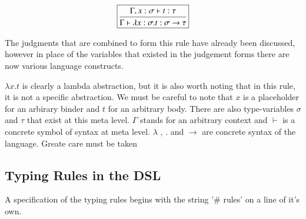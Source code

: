 $$\boxed{
\mbox{\begin {prooftree}
  \hypo{\Gamma , x : \sigma \vdash t : \tau}
  \infer1[]{\Gamma \vdash \lambda x : \sigma . t : \sigma \to \tau}
\end {prooftree}}
}$$


The judgments that are combined to form this rule have already been
discussed, however in place of the variables that existed in the
judgement forms there are now various language constructs.

$\lambda x . t$ is clearly a lambda abstraction, but it is also worth
noting that in this rule, it is not a specific abstraction. We must be
careful to note that $x$ is a placeholder for an arbirary binder and
$t$ for an arbitrary body. There are also type-variables $\sigma$ and
$\tau$ that exist at this meta level. $\Gamma$ stands for an arbitrary
context and $\vdash$ is a concrete symbol of syntax at meta
level. $\lambda$ , $.$ and $\to$ are concrete syntax of the
language. Greate care must be taken

\subsection{Typing Rules in the DSL}

A specification of the typing rules begins with the string '\# rules'
on a line of it's own.

